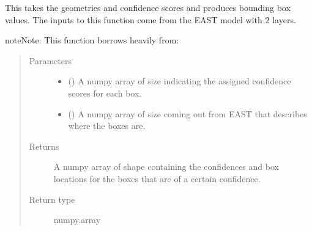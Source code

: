 \documentclass[letterpaper,10pt,english]{sphinxmanual}
\begin{document}

\begin{fulllineitems}
\label{\detokenize{api:readpyne.core.decode}}
This takes the geometries and confidence scores and produces bounding box values.
The inputs to this function come from the EAST model with 2 layers.

\begin{sphinxadmonition}{note}{Note:}
This function borrows heavily from:
\end{sphinxadmonition}
\begin{quote}\begin{description}
\item[{Parameters}] \leavevmode\begin{itemize}
\item {} 
 () \textendash{} A numpy array of size  indicating the assigned
confidence scores for each box.

\item {} 
 () \textendash{} A numpy array of size  coming out from EAST
that describes where the boxes are.

\end{itemize}

\item[{Returns}] \leavevmode
A numpy array of shape  containing the confidences and box locations
for the boxes that are of a certain confidence.

\item[{Return type}] \leavevmode
numpy.array

\end{description}\end{quote}

\end{fulllineitems}

\end{document}
